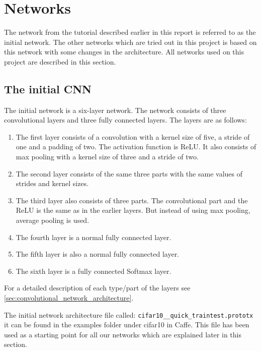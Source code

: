 \graphicspath{{Chapters/Project/}}

\section{Networks} %
\label{sec:networks}

The network from the tutorial described earlier in this report is referred to
as the initial network. The other networks which are tried out in this
project is based on this network with some changes in the architecture. All
networks used on this project are described in this section.

\subsection{The initial CNN} %
\label{sub:the_initial_network}

The initial network is a six-layer network. The network consists of three
convolutional layers and three fully connected layers. The layers are as
follows:

\begin{enumerate}
	\item The first layer consists of a convolution with a kernel size of five, a
	stride of one and a padding of two. The activation function is ReLU. It
	also consists of max pooling with a kernel size of three and a stride of two.
	\item The second layer consists of the same three parts with the same values
	of strides and kernel sizes.
	\item The third layer also consists of three parts. The convolutional part
	and the ReLU is the same as in the earlier layers. But instead of using max
	pooling, average pooling is used.
	\item The fourth layer is a normal fully connected layer.
	\item The fifth layer is also a normal fully connected layer.
	\item The sixth layer is a fully connected Softmax layer.
\end{enumerate}
For a detailed description of each type/part of the layers see
\autoref{sec:convolutional_network_architecture}.

The initial network architecture file called:
\verb|cifar10__quick_traintest.prototx| it can be found in the examples folder
under cifar10 in Caffe\cite{caffe}. This file has been used as a starting point
for all our networks which are explained later in this section. 

